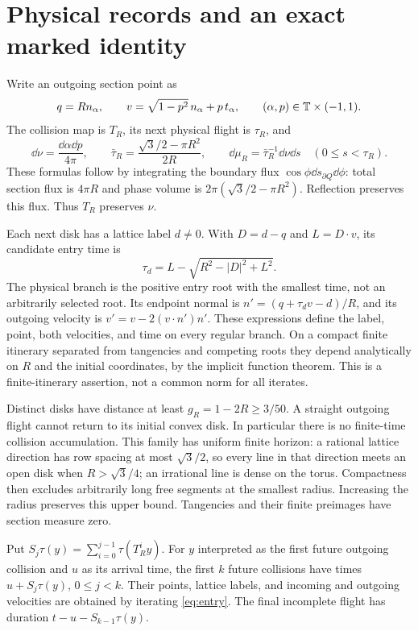 \section{Physical records and an exact marked identity}
Write an outgoing section point as
\[
 q=R n_\alpha,\qquad v=\sqrt{1-p^2}\,n_\alpha+p\,t_\alpha,
 \qquad (\alpha,p)\in\mathbb T\times(-1,1).
\]
The collision map is $T_R$, its next physical flight is $\tau_R$, and
\begin{equation}\label{eq:flux}
 \dd\nu=\frac{\dd\alpha\dd p}{4\pi},\qquad
 \bar\tau_R=\frac{\sqrt3/2-\pi R^2}{2R},\qquad
 \dd\mu_R=\bar\tau_R^{-1}\dd\nu\dd s\quad(0\le s<\tau_R).
\end{equation}
These formulas follow by integrating the boundary flux $\cos\phi\dd s_{\partial Q}\dd\phi$: total section flux is $4\pi R$ and phase volume is $2\pi(\sqrt3/2-\pi R^2)$. Reflection preserves this flux. Thus $T_R$ preserves $\nu$.

Each next disk has a lattice label $d\ne0$. With $D=d-q$ and $L=D\cdot v$, its candidate entry time is
\begin{equation}\label{eq:entry}
 \tau_d=L-\sqrt{R^2-|D|^2+L^2}.
\end{equation}
The physical branch is the positive entry root with the smallest time, not an arbitrarily selected root. Its endpoint normal is $n'=(q+\tau_dv-d)/R$, and its outgoing velocity is $v'=v-2(v\cdot n')n'$. These expressions define the label, point, both velocities, and time on every regular branch. On a compact finite itinerary separated from tangencies and competing roots they depend analytically on $R$ and the initial coordinates, by the implicit function theorem. This is a finite-itinerary assertion, not a common norm for all iterates.

Distinct disks have distance at least $g_R=1-2R\ge3/50$. A straight outgoing flight cannot return to its initial convex disk. In particular there is no finite-time collision accumulation. This family has uniform finite horizon: a rational lattice direction has row spacing at most $\sqrt3/2$, so every line in that direction meets an open disk when $R>\sqrt3/4$; an irrational line is dense on the torus. Compactness then excludes arbitrarily long free segments at the smallest radius. Increasing the radius preserves this upper bound. Tangencies and their finite preimages have section measure zero.

Put $S_j\tau(y)=\sum_{i=0}^{j-1}\tau(T_R^iy)$. For $y$ interpreted as the first future outgoing collision and $u$ as its arrival time, the first $k$ future collisions have times $u+S_j\tau(y)$, $0\le j<k$. Their points, lattice labels, and incoming and outgoing velocities are obtained by iterating \eqref{eq:entry}. The final incomplete flight has duration $t-u-S_{k-1}\tau(y)$.

